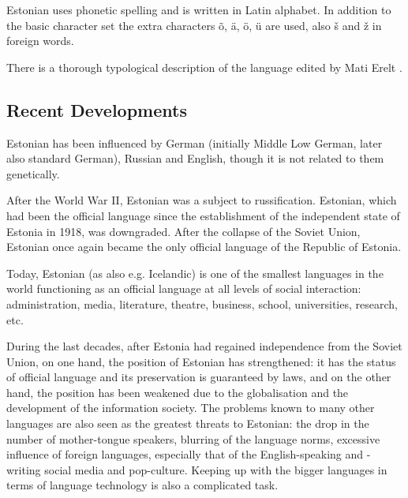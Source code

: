 \begin{multicols}{2}
Estonian uses phonetic spelling and is written in Latin alphabet. 
In addition to the basic character set the extra characters õ, ä, ö, ü are used, also š and ž in foreign words.

There is a thorough typological description of the language edited by Mati Erelt \cite{erelt2003}. %

\subsection{Recent Developments}

Estonian has been influenced by German (initially Middle Low German, later also standard German), Russian and English, though it is not related to them genetically.

After the World War II, Estonian was a subject to russiﬁcation. 
Estonian, which had been the official language since the establishment of the independent state of Estonia in 1918, was downgraded. 
After the collapse of the Soviet Union, Estonian once again became the
only official language of the Republic of Estonia. 
 
Today, Estonian (as also e.g. Icelandic) is one of the smallest languages in the world functioning as an official language at all levels of social interaction: administration, media, literature, theatre, business, school, universities, research, etc.

During the last decades, after Estonia had regained independence from the Soviet Union, on one hand, the position of Estonian has strengthened: it has the status of official language and its preservation is guaranteed by laws, and on the other hand, the position has been weakened due to the globalisation and the development of the information society. 
The problems known to many other languages are also seen as the greatest threats to Estonian: the drop in the number of mother-tongue speakers, blurring of the language norms, excessive inﬂuence of foreign languages, especially that of the English-speaking and -writing social media and pop-culture. 
Keeping up with the bigger languages in terms of language technology is also a complicated task.



\end{multicols}
